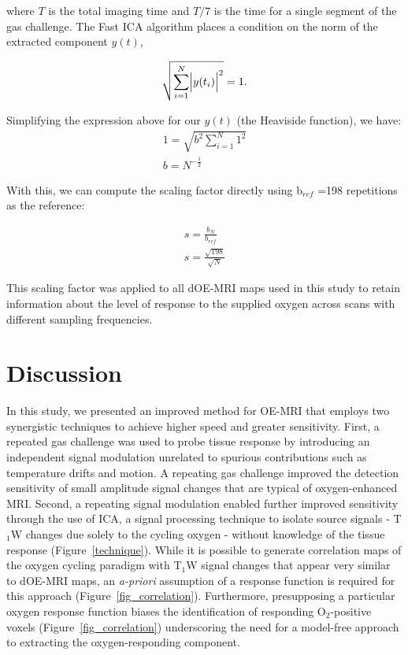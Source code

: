where $T$ is the total imaging time and $T/7$ is the time for a single segment of the gas challenge.
The Fast \acs{ICA} algorithm places a condition on the norm of the extracted component $y(t)$,

\begin{equation}
\sqrt{\sum_{i=1}^{N} \Bigl|y(t_i)\Bigr|^2} = 1.
\end{equation}

Simplifying the expression above for our $y(t)$ (the Heaviside function), we have:
\begin{align}
1 = \sqrt{b^2 \sum_{i=1}^{N} 1^2} \nonumber \\
b = N^{-\frac{1}{2}}
\end{align}

With this, we can compute the scaling factor directly using b$_{ref}$ =198 repetitions as the reference:

\begin{align}
s = \frac{b_{N}}{b_{ref}} \nonumber \\
s = \frac{\sqrt{198}}{\sqrt{N}} 
\end{align}

This scaling factor was applied to all \acs{dOE-MRI} maps used in this study to retain information about the level of response to the supplied oxygen across scans with different sampling frequencies.

\section{Discussion}

In this study, we presented an improved method for \acs{OE-MRI} that employs two synergistic techniques to achieve higher speed and greater sensitivity.
First, a repeated gas challenge was used to probe tissue response by introducing an independent signal modulation unrelated to spurious contributions such as temperature drifts and motion.
A repeating gas challenge improved the detection sensitivity of small amplitude signal changes that are typical of oxygen-enhanced MRI.
Second, a repeating signal modulation enabled further improved sensitivity through the use of \acs{ICA}, a signal processing technique to isolate source signals - T$_1$W changes due solely to the cycling oxygen - without knowledge of the tissue response (Figure~\ref{technique}).
While it is possible to generate correlation maps of the oxygen cycling paradigm with T$_1$W signal changes that appear very similar to \acs{dOE-MRI} maps, an \emph{a-priori} assumption of a response function is required for this approach (Figure~\ref{fig_correlation}).
Furthermore, presupposing a particular oxygen response function biases the identification of responding O$_2$-positive voxels (Figure~\ref{fig_correlation}) underscoring the need for a model-free approach to extracting the oxygen-responding component.

